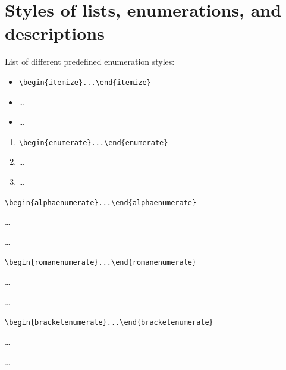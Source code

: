 \documentclass[a4paper,UKenglish,cleveref, autoref, thm-restate]{lipics-v2021}
\begin{document}




\appendix

\section{Styles of lists, enumerations, and descriptions}\label{sec:itemStyles}

List of different predefined enumeration styles:

\begin{itemize}
\item \verb|\begin{itemize}...\end{itemize}|
\item \dots
\item \dots
\end{itemize}

\begin{enumerate}
\item \verb|\begin{enumerate}...\end{enumerate}|
\item \dots
\item \dots
\end{enumerate}

\begin{alphaenumerate}
\item \verb|\begin{alphaenumerate}...\end{alphaenumerate}|
\item \dots
\item \dots
\end{alphaenumerate}

\begin{romanenumerate}
\item \verb|\begin{romanenumerate}...\end{romanenumerate}|
\item \dots
\item \dots
\end{romanenumerate}

\begin{bracketenumerate}
\item \verb|\begin{bracketenumerate}...\end{bracketenumerate}|
\item \dots
\item \dots
\end{bracketenumerate}
\end{document}
